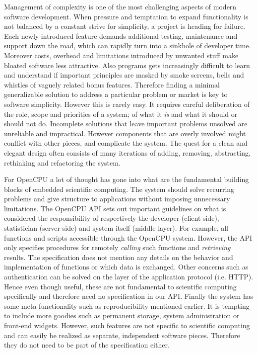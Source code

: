 \noindent Management of complexity is one of the most challenging aspects of modern software development. When pressure and temptation to expand functionality is not balanced by a constant strive for simplicity, a project is heading for failure. Each newly introduced feature demands additional testing, maintenance and support down the road, which can rapidly turn into a sinkhole of developer time. Moreover costs, overhead and limitations introduced by unwanted stuff make bloated software less attractive. Also programs gets increasingly difficult to learn and understand if important principles are masked by smoke screens, bells and whistles of vaguely related bonus features. Therefore finding a minimal generalizable solution to address a particular problem or market is key to software simplicity. However this is rarely easy. It requires careful deliberation of the role, scope and priorities of a system; of what it \emph{is} and what it should or should not do. Incomplete solutions that leave important problems unsolved are unreliable and impractical. However components that are overly involved might conflict with other pieces, and complicate the system. The quest for a clean and elegant design often consists of many iterations of adding, removing, abstracting, rethinking and refactoring the system.

For OpenCPU a lot of thought has gone into what are the fundamental building blocks of embedded scientific computing. The system should solve recurring problems and give structure to applications without imposing unnecessary limitations. The OpenCPU API sets out important guidelines on what is considered the responsibility of respectively the developer (client-side), statistician (server-side) and system itself (middle layer). For example, all \R functions and scripts accessible through the OpenCPU system. However, the API only specifies  procedures for remotely \emph{calling} such functions and \emph{retrieving} results. The specification does not mention any details on the behavior and implementation of functions or which data is exchanged. Other concerns such as authentication can be solved on the layer of the application protocol (i.e. HTTP). Hence even though useful, these are not fundamental to scientific computing specifically and therefore need no specification in our API. Finally the system has some meta-functionality such as reproducibility mentioned earlier. It is tempting to include more goodies such as permanent storage, system administration or front-end widgets. However, such features are not specific to scientific computing and can easily be realized as separate, independent software pieces. Therefore they do not need to be part of the specification either. 

